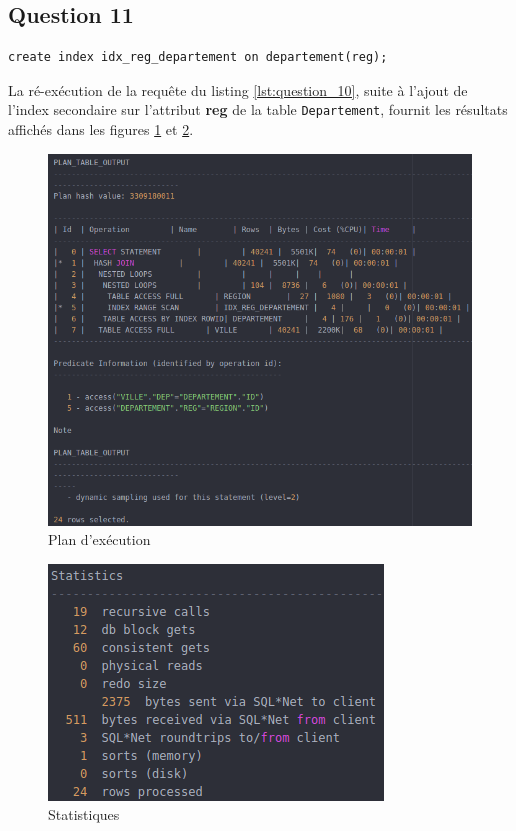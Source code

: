 \documentclass[a4paper,12pt]{article}
\begin{document}
\newpage

\subsection{Question 11}
\begin{lstlisting}[caption={ajout d'un index secondaire sur l'attribut reg de la table Departement}]
  create index idx_reg_departement on departement(reg);
\end{lstlisting}

La ré-exécution de la requête du listing \ref{lst:question_10}, suite à l'ajout de l'index secondaire sur l'attribut \textbf{reg} de la table \texttt{Departement}, fournit les résultats affichés dans les figures \ref{fig:11_1} et \ref{fig:11_2}.

\begin{figure}[!ht]
  \centering
  \includegraphics[scale=0.6]{images/q11_1.png}
  \caption{Plan d'exécution}
  \label{fig:11_1}
\end{figure}

\begin{figure}[!ht]
  \centering
  \includegraphics[scale=0.6]{images/q11_2.png}
  \caption{Statistiques}
  \label{fig:11_2}
\end{figure}
\end{document}
